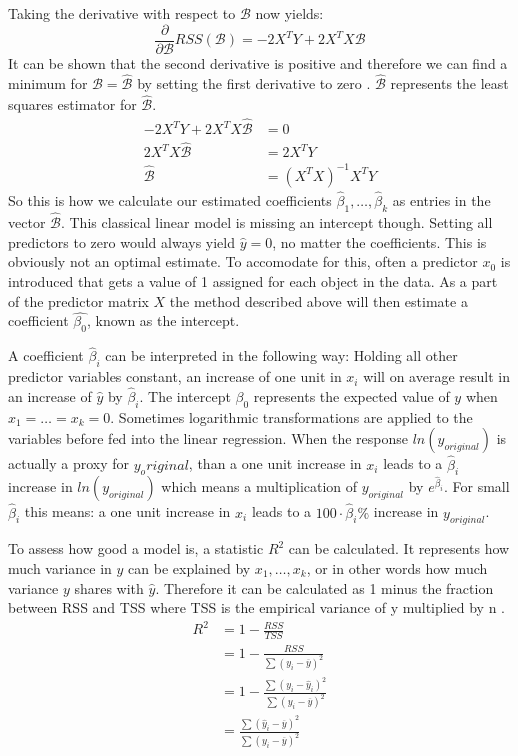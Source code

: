 \documentclass[12 pt]{scrartcl}
\begin{document}
Taking the derivative with respect to $\mathcal{B}$ now yields:
\[ \frac{\partial}{\partial \mathcal{B}} RSS(\mathcal{B}) = -2X^TY + 2X^TX\mathcal{B}\]
It can be shown that the second derivative is positive and therefore we can find a minimum for $\mathcal{B} = \hat{\mathcal{B}}$ by setting the first derivative to zero \citep[p.~106]{fahrmeir2013regression}.
$\hat{\mathcal{B}}$ represents the least squares estimator for $\hat{\mathcal{B}}$.
\begin{equation} \label{eq3}
  \begin{split}
    -2X^TY + 2X^TX\hat{\mathcal{B}} & = 0 \\
    2X^TX\hat{\mathcal{B}}    & =2X^TY \\
    \hat{\mathcal{B}}  & =(X^TX)^{-1}X^TY
  \end{split}
\end{equation}
So this is how we calculate our estimated coefficients $\hat{\beta}_1, \dots, \hat{\beta}_k$ as entries in the vector $\hat{\mathcal{B}}$. This classical linear model is missing an intercept though. Setting all predictors to zero would always yield $\hat{y} = 0$, no matter the coefficients. This is obviously not an optimal estimate. To accomodate for this, often a predictor $x_0$ is introduced that gets a value of 1 assigned for each object in the data. As a part of the predictor matrix $X$ the method described above will then estimate a coefficient $\hat{\beta_0}$, known as the intercept.

A coefficient $\hat{\beta}_i$ can be interpreted in the following way: Holding all other predictor variables constant, an increase of one unit in $x_i$ will on average result in an increase of $\hat{y}$ by $\hat{\beta}_i$. The intercept $\beta_0$ represents the expected value of $y$ when $x_1 = \dots = x_k = 0$.
Sometimes logarithmic transformations are applied to the variables before fed into the linear regression. When the response $ln(y_{original})$ is actually a proxy for $y_original$, than a one unit increase in $x_i$ leads to a $\hat{\beta}_i$ increase in $ln(y_{original})$ which means a multiplication of $y_{original}$ by $e^{\hat{\beta}_i}$. For small $\hat{\beta}_i$ this means: a one unit increase in $x_i$ leads to a $100 \cdot \hat{\beta}_i \%$ increase in $y_{original}$.

To assess how good a model is, a statistic $R^2$ can be calculated. It represents how much variance in $y$ can be explained by $x_1, \dots , x_k$, or in other words how much variance $y$ shares with $\hat{y}$. Therefore it can be calculated as 1 minus the fraction between RSS and TSS where TSS is the empirical variance of y multiplied by n \citep[p.~234]{james2013introduction}.
\begin{equation} \label{eqrsquared}
  \begin{split}
    R^2  & = 1-\frac{RSS}{TSS} \\
    & = 1-\frac{RSS}{\sum{(y_i - \overline{y})^2}} \\
    & = 1-\frac{\sum{(y_i - \hat{y}_i)^2}}{\sum{(y_i - \overline{y})^2}} \\
    & = \frac{\sum{(\hat{y}_i -\overline{y})^2}}{\sum{(y_i - \overline{y})^2}}
  \end{split}
\end{equation}
\end{document}
